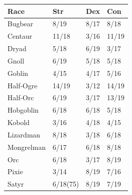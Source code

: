 \begin{multicols}{2}
\begin{minipage}{\columnwidth}
\noindent
{}
\begin{tabular}{|p{}|p{}|p{}|p{}|}
\hline
Race	& Str	& Dex	& Con \\
\hline\hline
\rowcolor[gray]{0.9}Bugbear	& 8/19	& 8/17	& 8/18 \\
Centaur	& 11/18	& 3/16	& 11/19 \\
\rowcolor[gray]{0.9}Dryad	& 5/18	& 6/19	& 3/17 \\
Gnoll	& 6/19	& 5/18	& 5/18 \\
\rowcolor[gray]{0.9}Goblin	& 4/15	& 4/17	& 5/16 \\
Half-Ogre	& 14/19	& 3/12	& 14/19 \\
\rowcolor[gray]{0.9}Half-Orc	& 6/19	& 3/17	& 13/19 \\
Hobgoblin	& 6/18	& 6/18	& 5/18 \\
\rowcolor[gray]{0.9}Kobold	& 3/16	& 4/18	& 4/15 \\
Lizardman	& 8/18	& 3/18	& 6/18 \\
\rowcolor[gray]{0.9}Mongrelman	& 6/17	& 6/18	& 8/18 \\
Orc	& 6/18	& 3/17	& 8/19 \\
\rowcolor[gray]{0.9}Pixie	& 3/14	& 8/19	& 7/16 \\
Satyr	& 6/18(75)	& 8/19	& 7/19 \\
\hline
\end{tabular}

\end{minipage}

\end{multicols}

